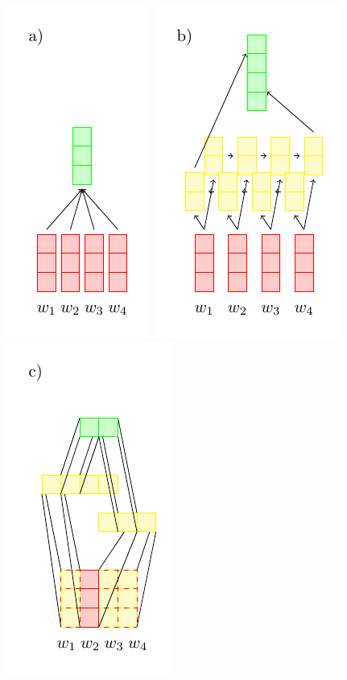 \begin{figure}
    \center
    \includegraphics[scale=.75]{figures/avgsentencoder.pdf}
    \includegraphics[scale=.75]{figures/rnnsentencoder.pdf}
    \includegraphics[scale=.75]{figures/cnnsentencoder.pdf}

\end{figure}
